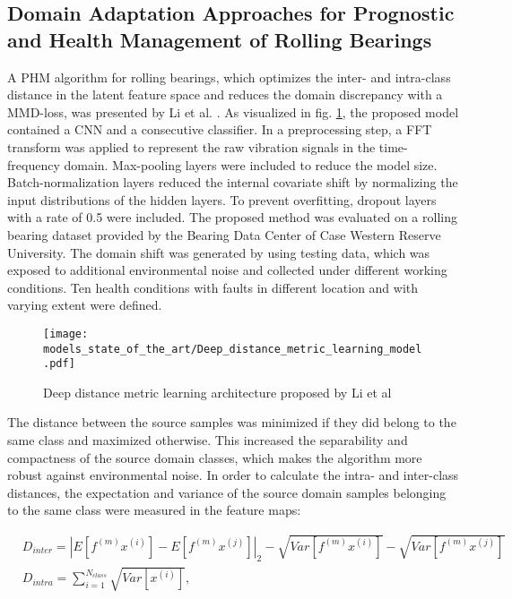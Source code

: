 \subsection{Domain Adaptation Approaches for Prognostic and Health Management of Rolling Bearings}

A PHM algorithm for rolling bearings, which optimizes the inter- and intra-class distance in the latent feature space and reduces the domain discrepancy with a MMD-loss, was presented by Li et al. \cite{Li2018}. As visualized in fig. \ref{fig:Deep_distance_metric_learning_model}, the proposed model contained a CNN and a consecutive classifier. In a preprocessing step, a FFT transform was applied to represent the raw vibration signals in the time-frequency domain. Max-pooling layers were included to reduce the model size. Batch-normalization layers reduced the internal covariate shift by normalizing the input distributions of the hidden layers. To prevent overfitting, dropout layers with a rate of 0.5 were included. The proposed method was evaluated on a rolling bearing dataset provided by the Bearing Data Center of Case Western Reserve University. The domain shift was generated by using testing data, which was exposed to additional environmental noise and collected under different working conditions. Ten health conditions with faults in different location and with varying extent were defined. 

\begin{figure}[H]
  \centering
  \texttt{[image: models\_state\_of\_the\_art/Deep\_distance\_metric\_learning\_model.pdf]}
  \caption{Deep distance metric learning architecture proposed by Li et al \cite{Li2018}}
  \label{fig:Deep_distance_metric_learning_model}
\end{figure}

The distance between the source samples was minimized if they did belong to the same class and maximized otherwise. This increased the separability and compactness of the source domain classes, which makes the algorithm more robust against environmental noise. In order to calculate the intra- and inter-class distances, the expectation and variance of the source domain samples belonging to the same class were measured in the feature maps:

\begin{equation}
    \begin{aligned}
       &D_{inter} = |E[f^{(m)}x^{(i)}]-E[f^{(m)}x^{(j)}]|_{2}-\sqrt{Var[f^{(m)}x^{(i)}]}-\sqrt{Var[f^{(m)}x^{(j)}]}\\
       &D_{intra} = 
        \sum_{i=1}^{N_{class}} \sqrt{Var[x^{(i)}]},
    \end{aligned}
\end{equation}

